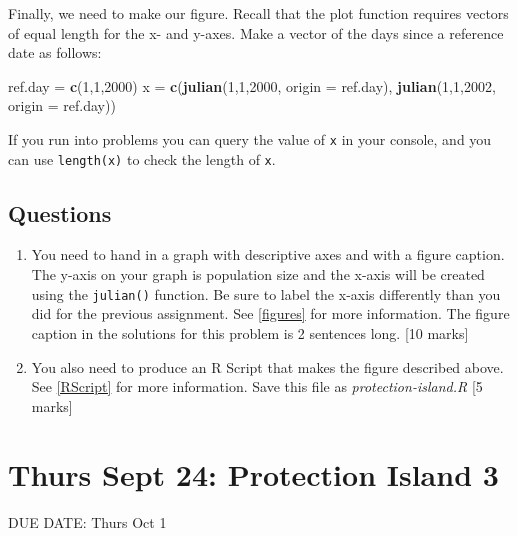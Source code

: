 \documentclass[]{book}
\newenvironment{Shaded}{\begin{snugshade}}{\end{snugshade}}
\newcommand{\KeywordTok}[1]{\textcolor[rgb]{0.13,0.29,0.53}{\textbf{{#1}}}}
\newcommand{\DataTypeTok}[1]{\textcolor[rgb]{0.13,0.29,0.53}{{#1}}}
\newcommand{\DecValTok}[1]{\textcolor[rgb]{0.00,0.00,0.81}{{#1}}}
\newcommand{\StringTok}[1]{\textcolor[rgb]{0.31,0.60,0.02}{{#1}}}
\newcommand{\NormalTok}[1]{{#1}}
\begin{document}
Finally, we need to make our figure. Recall that the plot function
requires vectors of equal length for the x- and y-axes. Make a vector of
the days since a reference date as follows:

\begin{Shaded}
\begin{Highlighting}[]
\NormalTok{ref.day =}\StringTok{ }\KeywordTok{c}\NormalTok{(}\DecValTok{1}\NormalTok{,}\DecValTok{1}\NormalTok{,}\DecValTok{2000}\NormalTok{)}
\NormalTok{x =}\StringTok{ }\KeywordTok{c}\NormalTok{(}\KeywordTok{julian}\NormalTok{(}\DecValTok{1}\NormalTok{,}\DecValTok{1}\NormalTok{,}\DecValTok{2000}\NormalTok{, }\DataTypeTok{origin =} \NormalTok{ref.day), }\KeywordTok{julian}\NormalTok{(}\DecValTok{1}\NormalTok{,}\DecValTok{1}\NormalTok{,}\DecValTok{2002}\NormalTok{, }\DataTypeTok{origin =} \NormalTok{ref.day))}
\end{Highlighting}
\end{Shaded}

If you run into problems you can query the value of \texttt{x} in your
console, and you can use \texttt{length(x)} to check the length of
\texttt{x}.

\section{Questions}\label{questions}

\begin{enumerate}
\def\labelenumi{\arabic{enumi}.}
\item
  You need to hand in a graph with descriptive axes and with a figure
  caption. The y-axis on your graph is population size and the x-axis
  will be created using the \texttt{julian()} function. Be sure to label
  the x-axis differently than you did for the previous assignment. See
  \ref{figures} for more information. The figure caption in the
  solutions for this problem is 2 sentences long. {[}10 marks{]}
\item
  You also need to produce an R Script that makes the figure described
  above. See \ref{RScript} for more information. Save this file as
  \emph{protection-island.R} {[}5 marks{]}
\end{enumerate}

\chapter{Thurs Sept 24: Protection Island 3}\label{PE3}

DUE DATE: Thurs Oct 1
\end{document}
